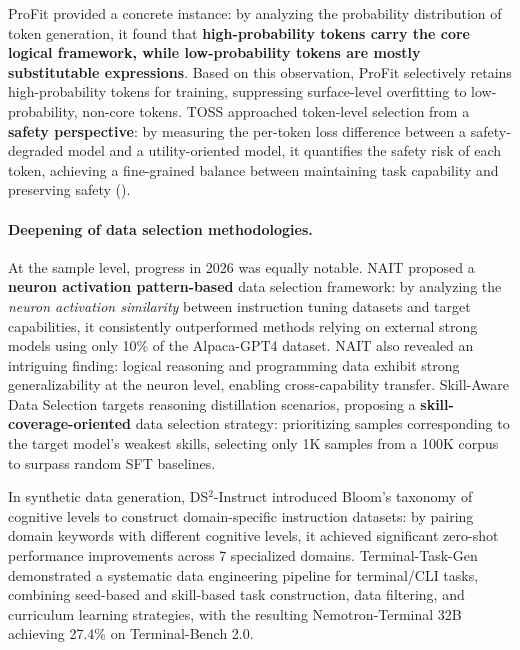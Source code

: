 ProFit \cite{liu2026profit} provided a concrete instance:
by analyzing the probability distribution of token generation,
it found that \textbf{high-probability tokens carry the core logical framework, while low-probability tokens are mostly substitutable expressions}.
Based on this observation, ProFit selectively retains high-probability tokens for training,
suppressing surface-level overfitting to low-probability, non-core tokens.
TOSS \cite{li2026toss} approached token-level selection from a \textbf{safety perspective}:
by measuring the per-token loss difference between a safety-degraded model and a utility-oriented model,
it quantifies the safety risk of each token,
achieving a fine-grained balance between maintaining task capability and preserving safety
().


\paragraph{Deepening of data selection methodologies.}
At the sample level, progress in 2026 was equally notable.
NAIT \cite{chen2026nait} proposed a \textbf{neuron activation pattern-based} data selection framework:
by analyzing the \emph{neuron activation similarity} between instruction tuning datasets and target capabilities,
it consistently outperformed methods relying on external strong models using only 10\% of the Alpaca-GPT4 dataset.
NAIT also revealed an intriguing finding:
logical reasoning and programming data exhibit strong generalizability at the neuron level,
enabling cross-capability transfer.
Skill-Aware Data Selection \cite{zhang2026skillaware}
targets reasoning distillation scenarios,
proposing a \textbf{skill-coverage-oriented} data selection strategy:
prioritizing samples corresponding to the target model's weakest skills,
selecting only 1K samples from a 100K corpus to surpass random SFT baselines.

In synthetic data generation,
DS$^2$-Instruct \cite{xu2026ds2instruct} introduced Bloom's taxonomy of cognitive levels
to construct domain-specific instruction datasets:
by pairing domain keywords with different cognitive levels,
it achieved significant zero-shot performance improvements across 7 specialized domains.
Terminal-Task-Gen \cite{pi2026terminaltaskgen} demonstrated
a systematic data engineering pipeline for terminal/CLI tasks,
combining seed-based and skill-based task construction,
data filtering, and curriculum learning strategies,
with the resulting Nemotron-Terminal 32B achieving 27.4\% on Terminal-Bench 2.0.

